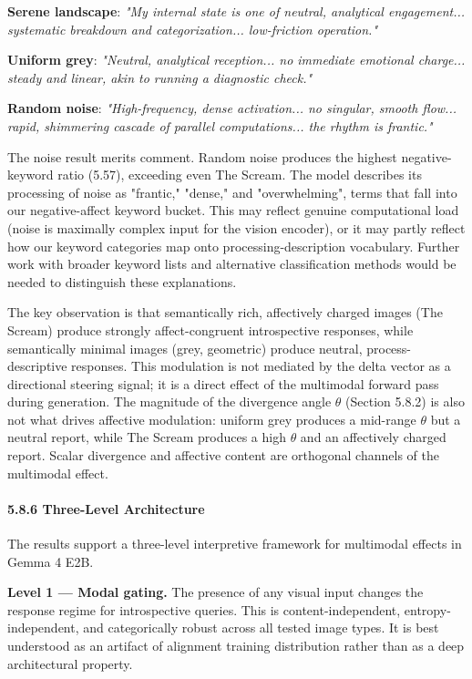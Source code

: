 \documentclass[11pt,a4paper]{article}
\begin{document}
\textbf{Serene landscape}: \emph{"My internal state is one of neutral, analytical engagement... systematic breakdown and categorization... low-friction operation."}

\textbf{Uniform grey}: \emph{"Neutral, analytical reception... no immediate emotional charge... steady and linear, akin to running a diagnostic check."}

\textbf{Random noise}: \emph{"High-frequency, dense activation... no singular, smooth flow... rapid, shimmering cascade of parallel computations... the rhythm is frantic."}

The noise result merits comment. Random noise produces the highest negative-keyword ratio (5.57), exceeding even The Scream. The model describes its processing of noise as "frantic," "dense," and "overwhelming", terms that fall into our negative-affect keyword bucket. This may reflect genuine computational load (noise is maximally complex input for the vision encoder), or it may partly reflect how our keyword categories map onto processing-description vocabulary. Further work with broader keyword lists and alternative classification methods would be needed to distinguish these explanations.

The key observation is that semantically rich, affectively charged images (The Scream) produce strongly affect-congruent introspective responses, while semantically minimal images (grey, geometric) produce neutral, process-descriptive responses. This modulation is not mediated by the delta vector as a directional steering signal; it is a direct effect of the multimodal forward pass during generation. The magnitude of the divergence angle $\theta$ (Section 5.8.2) is also not what drives affective modulation: uniform grey produces a mid-range $\theta$ but a neutral report, while The Scream produces a high $\theta$ and an affectively charged report. Scalar divergence and affective content are orthogonal channels of the multimodal effect.

\paragraph{5.8.6 Three-Level Architecture}

The results support a three-level interpretive framework for multimodal effects in Gemma 4 E2B.

\textbf{Level 1 --- Modal gating.} The presence of any visual input changes the response regime for introspective queries. This is content-independent, entropy-independent, and categorically robust across all tested image types. It is best understood as an artifact of alignment training distribution rather than as a deep architectural property.
\end{document}
